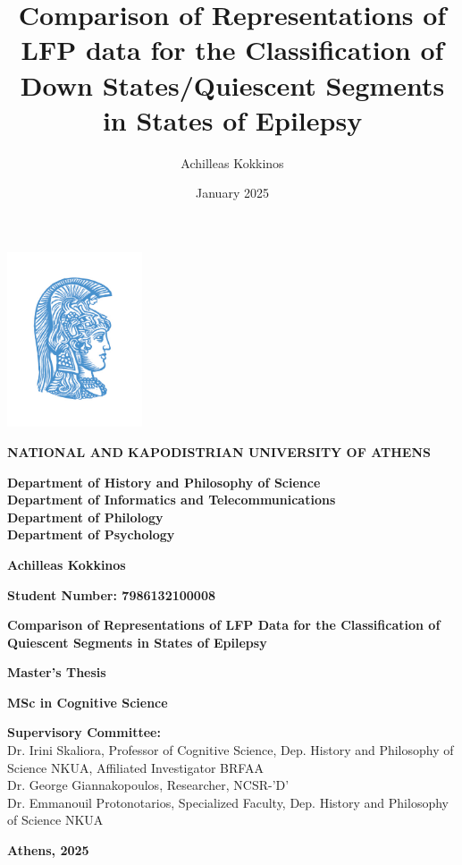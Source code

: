\documentclass{article}
\title{Comparison of Representations of LFP data for the Classification of Down States/Quiescent Segments in States of Epilepsy}
\author{Achilleas Kokkinos}
\date{January 2025}
\begin{document}
\begin{titlepage}
    \centering
    \includegraphics[width=0.3\textwidth]{LOGO_UOA COL2.jpg}\\
    \vspace*{1cm}
    
    \textbf{\LARGE NATIONAL AND KAPODISTRIAN UNIVERSITY OF ATHENS}
    
    \vspace{1cm}
    
    \textbf{Department of History and Philosophy of Science}\\
    \textbf{Department of Informatics and Telecommunications}\\
    \textbf{Department of Philology}\\
    \textbf{Department of Psychology}
    
    \vspace{1cm}
    
    \textbf{\Large Achilleas Kokkinos}
    
    \vfill
    
    \textbf{\Large Student Number: 7986132100008}
    
    \vfill
    
    {\huge \textbf{Comparison of Representations of LFP Data for the Classification of Quiescent Segments in States of Epilepsy}}
    
    \vfill
    
    \textbf{\Large Master’s Thesis}
    
    \vfill
    
    \textbf{\Large MSc in Cognitive Science}
    
    \vfill
    
    \textbf{Supervisory Committee:}\\
    Dr. Irini Skaliora, Professor of Cognitive Science, Dep. History and Philosophy of Science NKUA, Affiliated Investigator BRFAA\\
    Dr. George Giannakopoulos, Researcher, NCSR-’D’\\
    Dr. Emmanouil Protonotarios, Specialized Faculty, Dep. History and Philosophy of Science NKUA
    
    \vfill
    \textbf{Athens, 2025}

\end{titlepage}
\end{document}
